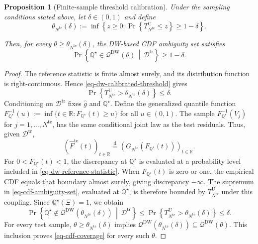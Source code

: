 \documentclass[review,11pt,3p,authoryear,nopreprintline]{elsarticle}
\newtheorem{proposition}{Proposition}
\begin{document}
\begin{proposition}[Finite-sample threshold calibration]
  \label{proposition-01}
  Under the sampling conditions stated above, let $\delta\in(0,1)$ and define
  \begin{equation}
    \theta_{N^{\mathrm{te}}}(\delta):=\inf\left\{z\ge0:\Pr\left\{T_{N^{\mathrm{te}}}^{\mathrm U}\le z\right\}\ge1-\delta\right\}.
    \label{eq-dw-calibrated-threshold}
  \end{equation}

  Then, for every $\theta\ge\theta_{N^{\mathrm{te}}}(\delta)$, the DW-based CDF ambiguity set satisfies
  \begin{equation}
    \Pr\left\{\mathbb Q^\star\in\mathscr Q^{\mathrm{DW}}(\theta)\,\middle|\,\mathcal D^{\mathrm{tr}}\right\}\ge1-\delta.
    \label{eq-cdf-coverage}
  \end{equation}
\end{proposition}
\begin{proof}
  The reference statistic is finite almost surely, and its distribution function is right-continuous. Hence \eqref{eq-dw-calibrated-threshold} gives
  \[
    \Pr\left\{T_{N^{\mathrm{te}}}^{\mathrm U}>\theta_{N^{\mathrm{te}}}(\delta)\right\}\le\delta.
  \]
  Conditioning on $\mathcal D^{\mathrm{tr}}$ fixes $\hat g$ and $\mathbb Q^\star$. Define the generalized quantile function $F_{\mathbb Q^\star}^{-1}(u):=\inf\{t\in\mathbb R:F_{\mathbb Q^\star}(t)\ge u\}$ for all $u\in(0,1)$. The sample $F_{\mathbb Q^\star}^{-1}(V_j)$ for $j=1,\ldots,N^{\mathrm{te}}$, has the same conditional joint law as the test residuals. Thus, given $\mathcal D^{\mathrm{tr}}$,
  \[
    \left(\widehat F^{\mathrm{te}}(t)\right)_{t\in\mathbb R}\overset{\mathrm d}{=}\left(G_{N^{\mathrm{te}}}\!\left(F_{\mathbb Q^\star}(t)\right)\right)_{t\in\mathbb R}.
  \]
  For $0<F_{\mathbb Q^\star}(t)<1$, the discrepancy at $\mathbb Q^\star$ is evaluated at a probability level included in \eqref{eq-dw-reference-statistic}. When $F_{\mathbb Q^\star}(t)$ is zero or one, the empirical CDF equals that boundary almost surely, giving discrepancy $-\infty$. The supremum in \eqref{eq-cdf-ambiguity-set}, evaluated at $\mathbb Q^\star$, is therefore bounded by $T_{N^{\mathrm{te}}}^{\mathrm U}$ under this coupling. Since $\mathbb Q^\star(\Xi)=1$, we obtain
  \[
    \Pr\left\{\mathbb Q^\star\notin\mathscr Q^{\mathrm{DW}}\!\left(\theta_{N^{\mathrm{te}}}(\delta)\right)\,\middle|\,\mathcal D^{\mathrm{tr}}\right\}
    \le\Pr\left\{T_{N^{\mathrm{te}}}^{\mathrm U}>\theta_{N^{\mathrm{te}}}(\delta)\right\}\le\delta.
  \]
  For every test sample, $\theta\ge\theta_{N^{\mathrm{te}}}(\delta)$ implies $\mathscr Q^{\mathrm{DW}}\!\left(\theta_{N^{\mathrm{te}}}(\delta)\right)\subseteq\mathscr Q^{\mathrm{DW}}(\theta)$. This inclusion proves \eqref{eq-cdf-coverage} for every such $\theta$.
\end{proof}
\end{document}
